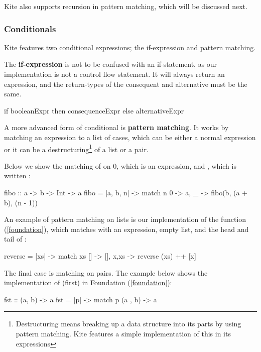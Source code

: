 Kite also supports recursion in pattern matching, which will be discussed next.

\subsubsection{Conditionals}
\label{subsubsec:conditionals}
Kite features two conditional expressions; the if-expression and pattern matching.

The \textbf{if-expression} is not to be confused with an if-statement, as our implementation is not a control flow statement. It will always return an expression, and the return-types of the consequent and alternative must be the same.

\begin{kite}
if booleanExpr then consequenceExpr else alternativeExpr
\end{kite}

A more advanced form of conditional is \textbf{pattern matching}. It works by matching an expression to a list of cases, which can be either a normal expression or it can be a destructuring\footnote{Destructuring means breaking up a data structure into its parts by using pattern matching. Kite features a simple implementation of this in its  expressions} of a list or a pair.

Below we show the matching of  on 0, which is an expression, and , which is written :

\begin{kite}
fibo :: a -> b -> Int -> a
fibo = |a, b, n| -> {
  match n {
    0 -> a,
    _ -> fibo(b, (a + b), (n - 1))
  }
}
\end{kite}

An example of pattern matching on lists is our implementation of the function  (\ref{foundation}), which matches  with an expression, empty list, and the head and tail of :

\begin{kite}
reverse = |xs| -> {
  match xs {
    []    -> [],
    x,xs  -> reverse (xs) ++ [x]
  }
}
\end{kite}

The final case is matching on pairs. The example below shows the implementation of  (first) in Foundation (\ref{foundation}):
\begin{kite}
fst :: (a, b) -> a
fst = |p| -> {
  match p {
    (a , b) -> a
  }
}
\end{kite}

